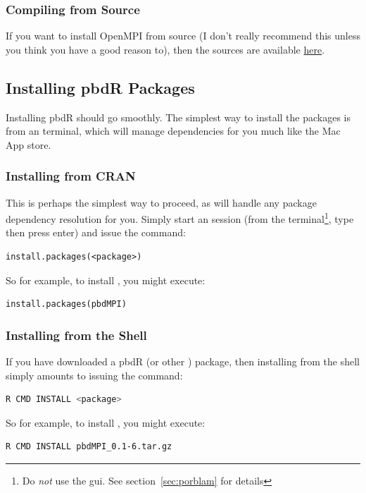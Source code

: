\subsubsection{Compiling from Source}

If you want to install OpenMPI from source (I don't really recommend this unless you think you have a good reason to), then the sources are available \href{http://www.open-mpi.org/software/ompi/v1.6/}{here}.





\subsection{Installing pbdR Packages}
Installing pbdR should go smoothly.  The simplest way to install the packages is from an  terminal, which will manage dependencies for you much like the Mac App store.


\subsubsection{Installing from CRAN}
This is perhaps the simplest way to proceed, as  will handle any package dependency resolution for you.  Simply start an  session (from the terminal\footnote{Do \emph{not} use the gui.  See section~\ref{sec:porblam} for details}, type  then press enter) and issue the command:
\begin{lstlisting}[language=rr]
install.packages(<package>)
\end{lstlisting}
So for example, to install , you might execute:
\begin{lstlisting}[language=rr]
install.packages(pbdMPI)
\end{lstlisting}


\subsubsection{Installing from the Shell}
If you have downloaded a pbdR (or other ) package, then installing from the shell simply amounts to issuing the command:
\begin{lstlisting}[language=sh]
R CMD INSTALL <package>
\end{lstlisting}
So for example, to install , you might execute:
\begin{lstlisting}[language=sh]
R CMD INSTALL pbdMPI_0.1-6.tar.gz
\end{lstlisting}


